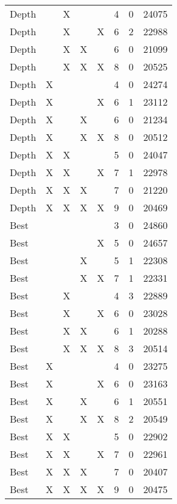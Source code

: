 \begin{tabular}{lllllrrr}
   Depth &    &  X &    &    &        4 &       0 &      24075 \\
   Depth &    &  X &    &  X &        6 &       2 &      22988 \\
   Depth &    &  X &  X &    &        6 &       0 &      21099 \\
   Depth &    &  X &  X &  X &        8 &       0 &      20525 \\
   Depth &  X &    &    &    &        4 &       0 &      24274 \\
   Depth &  X &    &    &  X &        6 &       1 &      23112 \\
   Depth &  X &    &  X &    &        6 &       0 &      21234 \\
   Depth &  X &    &  X &  X &        8 &       0 &      20512 \\
   Depth &  X &  X &    &    &        5 &       0 &      24047 \\
   Depth &  X &  X &    &  X &        7 &       1 &      22978 \\
   Depth &  X &  X &  X &    &        7 &       0 &      21220 \\
   Depth &  X &  X &  X &  X &        9 &       0 &      20469 \\
    Best &    &    &    &    &        3 &       0 &      24860 \\
    Best &    &    &    &  X &        5 &       0 &      24657 \\
    Best &    &    &  X &    &        5 &       1 &      22308 \\
    Best &    &    &  X &  X &        7 &       1 &      22331 \\
    Best &    &  X &    &    &        4 &       3 &      22889 \\
    Best &    &  X &    &  X &        6 &       0 &      23028 \\
    Best &    &  X &  X &    &        6 &       1 &      20288 \\
    Best &    &  X &  X &  X &        8 &       3 &      20514 \\
    Best &  X &    &    &    &        4 &       0 &      23275 \\
    Best &  X &    &    &  X &        6 &       0 &      23163 \\
    Best &  X &    &  X &    &        6 &       1 &      20551 \\
    Best &  X &    &  X &  X &        8 &       2 &      20549 \\
    Best &  X &  X &    &    &        5 &       0 &      22902 \\
    Best &  X &  X &    &  X &        7 &       0 &      22961 \\
    Best &  X &  X &  X &    &        7 &       0 &      20407 \\
    Best &  X &  X &  X &  X &        9 &       0 &      20475 \\
\bottomrule
\end{tabular}
\unskip